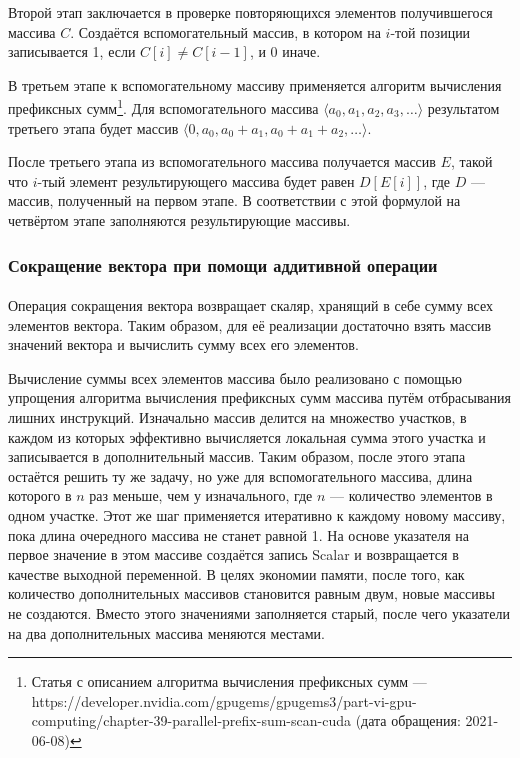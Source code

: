 \documentclass[14pt]{matmex-diploma-custom}
\begin{document}
Второй этап заключается в проверке повторяющихся элементов получившегося массива \(C\). Создаётся вспомогательный массив, в котором на \(i\)-той позиции записывается 1, если \(C[i] \neq C[i-1]\), и 0 иначе.

В третьем этапе к вспомогательному массиву применяется алгоритм вычисления префиксных сумм\footnote{Статья с описанием алгоритма вычисления префиксных сумм --- https://developer.nvidia.com/gpugems/gpugems3/part-vi-gpu-computing/chapter-39-parallel-prefix-sum-scan-cuda (дата обращения: 2021-06-08)}. Для вспомогательного массива \(\langle a_0, a_1, a_2, a_3, \dots\rangle\) результатом третьего этапа будет массив \(\langle 0, a_0, a_0 + a_1, a_0 + a_1 + a_2, \dots\rangle\).

После третьего этапа из вспомогательного массива получается массив \(E\), такой что \(i\)-тый элемент результирующего массива будет равен \(D[E[i]]\), где \(D\) --- массив, полученный на первом этапе. В соответствии с этой формулой на четвёртом этапе заполняются результирующие массивы.

\subsubsection{Сокращение вектора при помощи аддитивной операции}
\paragraph{}Операция сокращения вектора возвращает скаляр, хранящий в себе сумму всех элементов вектора. Таким образом, для её реализации достаточно взять массив значений вектора и вычислить сумму всех его элементов.

Вычисление суммы всех элементов массива было реализовано с помощью упрощения алгоритма вычисления префиксных сумм массива путём отбрасывания лишних инструкций. Изначально массив делится на множество участков, в каждом из которых эффективно вычисляется локальная сумма этого участка и записывается в дополнительный массив. Таким образом, после этого этапа остаётся решить ту же задачу, но уже для вспомогательного массива, длина которого в \(n\) раз меньше, чем у изначального, где \(n\) --- количество элементов в одном участке. Этот же шаг применяется итеративно к каждому новому массиву, пока длина очередного массива не станет равной 1. На основе указателя на первое значение в этом массиве создаётся запись Scalar и возвращается в качестве выходной переменной. В целях экономии памяти, после того, как количество дополнительных массивов становится равным двум, новые массивы не создаются. Вместо этого значениями заполняется старый, после чего указатели на два дополнительных массива меняются местами.
\end{document}
